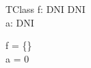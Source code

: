 \documentclass{article}
\begin{document}
\begin{zed}
  [DNI]
\end{zed}



\begin{schema}{TClass}
	f: DNI \pfun DNI \\
	a: DNI
	
\where
	f = \{\}  \\
	a = 0


\end{schema}
\end{document}
